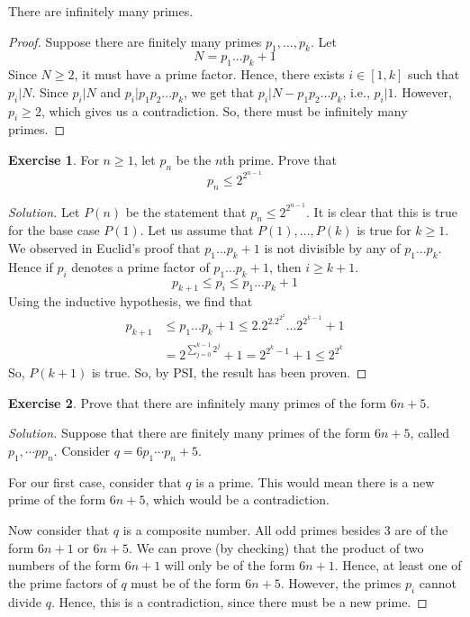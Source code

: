 \documentclass[12pt,letterpaper]{amsbook}
\theoremstyle{definition}
\newtheorem*{exercise}{Exercise}
\newenvironment{solution}
  {\renewcommand\qedsymbol{$\blacksquare$}\begin{proof}[Solution]}
  {\end{proof}}
\begin{document}
\begin{theorem}[Euclid]
  There are infinitely many primes.
\end{theorem}

\begin{proof}
  Suppose there are finitely many primes $p_1,...,p_k$. Let
  \[N = p_1...p_k + 1\]
  Since $N \geq 2$, it must have a prime factor. Hence, there exists $i \in [1,k]$ such that $p_i | N$. Since $p_i|N$ and $p_i|p_1p_2...p_k$, we get that $p_i|N-p_1p_2...p_k$, i.e., $p_i|1$. However, $p_i \geq 2$, which gives us a contradiction. So, there must be infinitely many primes.
\end{proof}

\begin{exercise}
  For $n \geq 1$, let $p_n$ be the $n$th prime. Prove that
  \[p_n \leq 2^{2^{n-1}}\]
\end{exercise}

\begin{solution}
  Let $P(n)$ be the statement that $p_n \leq 2^{2^{n-1}}$. It is clear that this is true for the base case $P(1)$. Let us assume that $P(1),...,P(k)$ is true for $k \geq 1$.
  We observed in Euclid's proof that $p_1...p_k+1$ is not divisible by any of $p_1...p_k$. Hence if $p_i$ denotes a prime factor of $p_1...p_k+1$, then $i \geq k+1$.
  \[p_{k+1} \leq p_i \leq p_1...p_k+1\]
  Using the inductive hypothesis, we find that
  \begin{align*}
    p_{k+1} &\leq p_1...p_k+1 \leq 2.2^2.2^{2^2}...2^{2^{k-1}}+1 \\
            &= 2^{\sum_{j=0}^{k-1} 2^j}+1 = 2^{2^k-1}+1 \leq 2^{2^k}
  \end{align*}
  So, $P(k+1)$ is true. So, by PSI, the result has been proven.
\end{solution}

\begin{exercise}
  Prove that there are infinitely many primes of the form $6n+5$.  
\end{exercise}
\begin{solution}
  Suppose that there are finitely many primes of the form $6n+5$, called $p_1,\cdots pp_n$. Consider $q = 6p_1\cdots p_n+5$.

  For our first case, consider that $q$ is a prime. This would mean there is a new prime of the form $6n+5$, which would be a contradiction.

  Now consider that $q$ is a composite number. All odd primes besides 3 are of the form $6n+1$ or $6n+5$. We can prove (by checking) that the product of two numbers of the form $6n+1$ will only be of the form $6n+1$. Hence, at least one of the prime factors of $q$ must be of the form $6n+5$. However, the primes $p_i$ cannot divide $q$. Hence, this is a contradiction, since there must be a new prime.
\end{solution}
\end{document}
